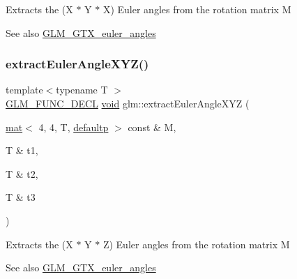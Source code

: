 Extracts the (X $\ast$ Y $\ast$ X) Euler angles from the rotation matrix M \begin{DoxySeeAlso}{See also}
\hyperlink{group__gtx__euler__angles}{G\+L\+M\+\_\+\+G\+T\+X\+\_\+euler\+\_\+angles} 
\end{DoxySeeAlso}
\mbox{\label{group__gtx__euler__angles_gacea701562f778c1da4d3a0a1cf091000}} 
\subsubsection{\texorpdfstring{extract\+Euler\+Angle\+X\+Y\+Z()}{extractEulerAngleXYZ()}}
{\footnotesize\ttfamily template$<$typename T $>$ \\
\hyperlink{setup_8hpp_ab2d052de21a70539923e9bcbf6e83a51}{G\+L\+M\+\_\+\+F\+U\+N\+C\+\_\+\+D\+E\+CL} \hyperlink{_s_d_l__opengles2__gl2ext_8h_ae5d8fa23ad07c48bb609509eae494c95}{void} glm\+::extract\+Euler\+Angle\+X\+YZ (\begin{DoxyParamCaption}\item[{\hyperlink{structglm_1_1mat}{mat}$<$ 4, 4, T, \hyperlink{namespaceglm_a36ed105b07c7746804d7fdc7cc90ff25a9d21ccd8b5a009ec7eb7677befc3bf51}{defaultp} $>$ const \&}]{M,  }\item[{T \&}]{t1,  }\item[{T \&}]{t2,  }\item[{T \&}]{t3 }\end{DoxyParamCaption})}

Extracts the (X $\ast$ Y $\ast$ Z) Euler angles from the rotation matrix M \begin{DoxySeeAlso}{See also}
\hyperlink{group__gtx__euler__angles}{G\+L\+M\+\_\+\+G\+T\+X\+\_\+euler\+\_\+angles} 
\end{DoxySeeAlso}
\mbox{\label{group__gtx__euler__angles_gacf0bc6c031f25fa3ee0055b62c8260d0}} 
